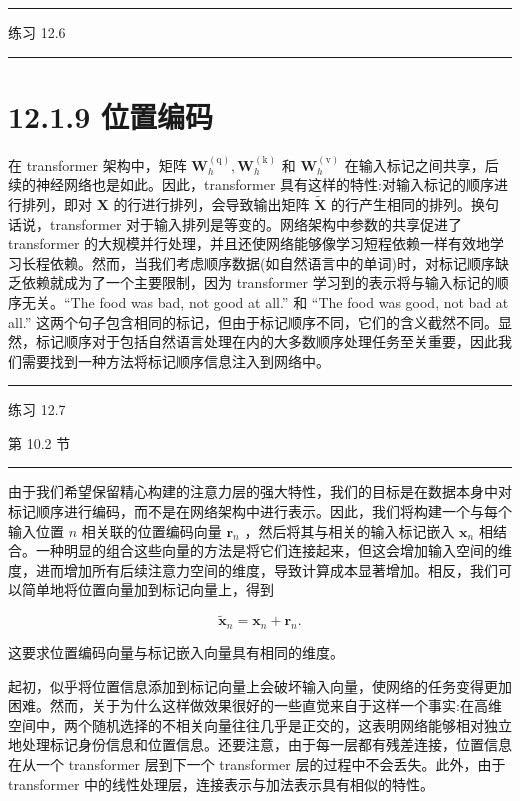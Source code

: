 \documentclass[10pt]{article}
\newcommand{\HRule}{\begin{center}\rule{0.9\linewidth}{0.2mm}\end{center}}
\begin{document}
\HRule

练习 12.6

\HRule

\section*{12.1.9 位置编码}

在 transformer 架构中，矩阵 \({\mathbf{W}}_{h}^{\left( \mathrm{q}\right) },{\mathbf{W}}_{h}^{\left( \mathrm{k}\right) }\) 和 \({\mathbf{W}}_{h}^{\left( \mathrm{v}\right) }\) 在输入标记之间共享，后续的神经网络也是如此。因此，transformer 具有这样的特性:对输入标记的顺序进行排列，即对 \(\mathbf{X}\) 的行进行排列，会导致输出矩阵 \(\widetilde{\mathbf{X}}\) 的行产生相同的排列。换句话说，transformer 对于输入排列是等变的。网络架构中参数的共享促进了 transformer 的大规模并行处理，并且还使网络能够像学习短程依赖一样有效地学习长程依赖。然而，当我们考虑顺序数据(如自然语言中的单词)时，对标记顺序缺乏依赖就成为了一个主要限制，因为 transformer 学习到的表示将与输入标记的顺序无关。“The food was bad, not good at all.” 和 “The food was good, not bad at all.” 这两个句子包含相同的标记，但由于标记顺序不同，它们的含义截然不同。显然，标记顺序对于包括自然语言处理在内的大多数顺序处理任务至关重要，因此我们需要找到一种方法将标记顺序信息注入到网络中。

\HRule

练习 12.7

第 10.2 节

\HRule

由于我们希望保留精心构建的注意力层的强大特性，我们的目标是在数据本身中对标记顺序进行编码，而不是在网络架构中进行表示。因此，我们将构建一个与每个输入位置 \(n\) 相关联的位置编码向量 \({\mathbf{r}}_{n}\) ，然后将其与相关的输入标记嵌入 \({\mathbf{x}}_{n}\) 相结合。一种明显的组合这些向量的方法是将它们连接起来，但这会增加输入空间的维度，进而增加所有后续注意力空间的维度，导致计算成本显著增加。相反，我们可以简单地将位置向量加到标记向量上，得到

\[
{\widetilde{\mathbf{x}}}_{n} = {\mathbf{x}}_{n} + {\mathbf{r}}_{n}. \tag{12.24}
\]

这要求位置编码向量与标记嵌入向量具有相同的维度。

起初，似乎将位置信息添加到标记向量上会破坏输入向量，使网络的任务变得更加困难。然而，关于为什么这样做效果很好的一些直觉来自于这样一个事实:在高维空间中，两个随机选择的不相关向量往往几乎是正交的，这表明网络能够相对独立地处理标记身份信息和位置信息。还要注意，由于每一层都有残差连接，位置信息在从一个 transformer 层到下一个 transformer 层的过程中不会丢失。此外，由于 transformer 中的线性处理层，连接表示与加法表示具有相似的特性。
\end{document}
